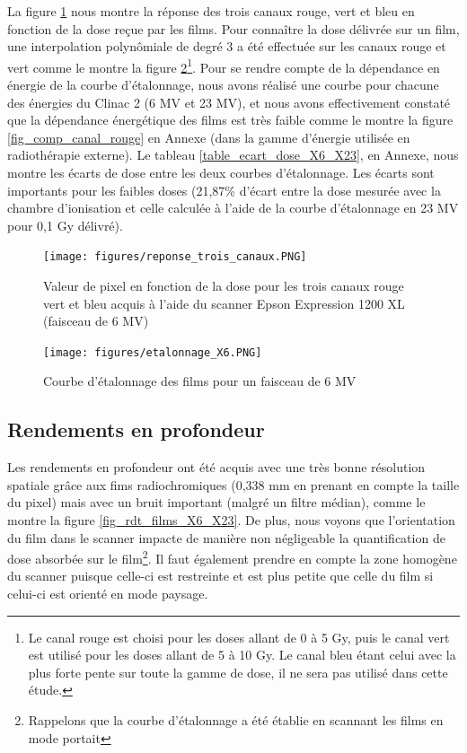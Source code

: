 \documentclass{book}
\begin{document}
La figure \ref*{fig_reponse_canaux} nous montre la réponse des trois canaux rouge, vert et bleu en fonction de la dose reçue par les films. Pour connaître la dose délivrée sur un film, une interpolation polynômiale de degré 3 a été effectuée sur les canaux rouge et vert comme le montre la figure \ref*{fig_courbe_etalonnage}\footnote{Le canal rouge est choisi pour les doses allant de 0 à 5 Gy, puis le canal vert est utilisé pour les doses allant de 5 à 10 Gy. Le canal bleu étant celui avec la plus forte pente sur toute la gamme de dose, il ne sera pas utilisé dans cette étude.}. Pour se rendre compte de la dépendance en énergie de la courbe d'étalonnage, nous avons réalisé une courbe pour chacune des énergies du Clinac 2 (6 MV et 23 MV), et nous avons effectivement constaté que la dépendance énergétique des films est très faible comme le montre la figure \ref*{fig_comp_canal_rouge} en Annexe (dans la gamme d'énergie utilisée en radiothérapie externe). Le tableau \ref*{table_ecart_dose_X6_X23}, en Annexe, nous montre les écarts de dose entre les deux courbes d'étalonnage. Les écarts sont importants pour les faibles doses (21,87\% d'écart entre la dose mesurée avec la chambre d'ionisation et celle calculée à l'aide de la courbe d'étalonnage en 23 MV pour 0,1 Gy délivré).


\begin{figure}[h]
  \centering
  \texttt{[image: figures/reponse\_trois\_canaux.PNG]}
  \caption{Valeur de pixel en fonction de la dose pour les trois canaux rouge vert et bleu acquis à l'aide du scanner Epson Expression 1200 XL (faisceau de 6 MV)}
  \label{fig_reponse_canaux}
\end{figure}

\begin{figure}[h]
  \centering
  \texttt{[image: figures/etalonnage\_X6.PNG]}
  \caption{Courbe d'étalonnage des films pour un faisceau de 6 MV}
  \label{fig_courbe_etalonnage}
\end{figure}

\newpage
\subsection{Rendements en profondeur}

Les rendements en profondeur ont été acquis avec une très bonne résolution spatiale grâce aux fims radiochromiques (0,338 mm en prenant en compte la taille du pixel) mais avec un bruit important (malgré un filtre médian), comme le montre la figure \ref*{fig_rdt_films_X6_X23}. De plus, nous voyons que l'orientation du film dans le scanner impacte de manière non négligeable la quantification de dose absorbée sur le film\footnote{Rappelons que la courbe d'étalonnage a été établie en scannant les films en mode portait}. Il faut également prendre en compte la zone homogène du scanner puisque celle-ci est restreinte et est plus petite que celle du film si celui-ci est orienté en mode paysage. 
\end{document}
